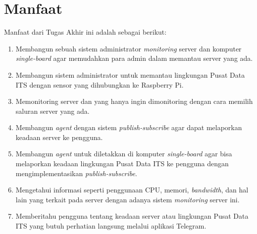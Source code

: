 \section{Manfaat}
Manfaat dari Tugas Akhir ini adalah sebagai berikut:

\begin{enumerate}
	\item Membangun sebuah sistem administrator \textit{monitoring} server dan komputer \textit{single-board} agar memudahkan para admin dalam memantau server yang ada.
	\item Membangun sistem administrator untuk memantau lingkungan Pusat Data ITS dengan sensor yang dihubungkan ke Raspberry Pi.
	\item Memonitoring server dan yang hanya ingin dimonitoring dengan cara memilih saluran server yang ada.
	\item Membangun \textit{agent} dengan sistem \textit{publish-subscribe} agar dapat melaporkan keadaan server ke pengguna.
	\item Membangun \textit{agent} untuk diletakkan di komputer \textit{single-board} agar bisa melaporkan keadaan lingkungan Pusat Data ITS ke pengguna dengan mengimplementasikan \textit{publish-subscribe}.
	\item Mengetahui informasi seperti penggunaan CPU, memori, \textit{bandwidth}, dan hal lain yang terkait pada server dengan adanya sistem \textit{monitoring} server ini.
	\item Memberitahu pengguna tentang keadaan server atau lingkungan Pusat Data ITS yang butuh perhatian langsung melalui aplikasi Telegram.
\end{enumerate}

